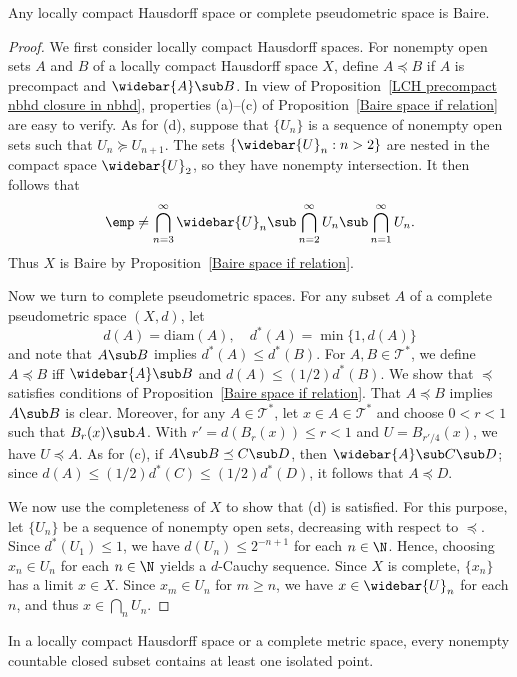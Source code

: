 \begin{theorem}
Any locally compact Hausdorff space or complete pseudometric space is Baire.
\end{theorem}
\begin{proof}
We first consider locally compact Hausdorff spaces. For nonempty open sets $A$ and $B$ of a locally compact Hausdorff space $X$, define $A\preceq B$ if $A$ is precompact and $\widebar{A}\sub B$. In view of Proposition~\ref{LCH precompact nbhd closure in nbhd}, properties (a)--(c) of Proposition~\ref{Baire space if relation} are easy to verify. As for (d), suppose that $\{U_n\}$ is a sequence of nonempty open sets such that $U_n\succeq U_{n+1}$. The sets $\{\widebar{U}_n:n>2\}$ are nested in the compact space $\widebar{U}_2$, so they have nonempty intersection. It then follows that
\[\emp\neq\bigcap_{n=3}^{\infty}\widebar{U}_n\sub\bigcap_{n=2}^{\infty}U_n\sub\bigcap_{n=1}^{\infty}U_n.\]
Thus $X$ is Baire by Proposition~\ref{Baire space if relation}.\par
Now we turn to complete pseudometric spaces. For any subset $A$ of a complete pseudometric space $(X,d)$, let
\[d(A)=\mathrm{diam}(A),\quad d^*(A)=\min\{1,d(A)\}\]
and note that $A\sub B$ implies $d^*(A)\leq d^*(B)$. For $A,B\in\mathcal{T}^*$, we define $A\preceq B$ iff $\widebar{A}\sub B$ and $d(A)\leq(1/2)d^*(B)$. We show that $\preceq$ satisfies conditions of Proposition~\ref{Baire space if relation}. That $A\preceq B$ implies $A\sub B$ is clear. Moreover, for any $A\in\mathcal{T}^*$, let $x\in A\in\mathcal{T}^*$ and choose $0<r<1$ such that $B_r(x)\sub A$. With $r'=d(B_r(x))\leq r<1$ and $U=B_{r'/4}(x)$, we have $U\preceq A$. As for (c), if $A\sub B\preceq C\sub D$, then $\widebar{A}\sub C\sub D$; since $d(A)\leq (1/2)d^*(C)\leq(1/2)d^*(D)$, it follows that $A\preceq D$.\par
We now use the completeness of $X$ to show that (d) is satisfied. For this purpose, let $\{U_n\}$ be a sequence of nonempty open sets, decreasing with respect to $\preceq$. Since $d^*(U_1)\leq 1$, we have $d(U_n)\leq 2^{-n+1}$ for each $n\in\N$. Hence, choosing $x_n\in U_n$ for each $n\in\N$ yields a $d$-Cauchy sequence. Since $X$ is complete, $\{x_n\}$ has a limit $x\in X$. Since $x_m\in U_n$ for $m\geq n$, we have $x\in\widebar{U}_n$ for each $n$, and thus $x\in\bigcap_nU_n$. 
\end{proof}
\begin{corollary}\label{countable closed isolated}
In a locally compact Hausdorff space or a complete metric space, every nonempty countable closed subset contains at least one isolated point.
\end{corollary}

